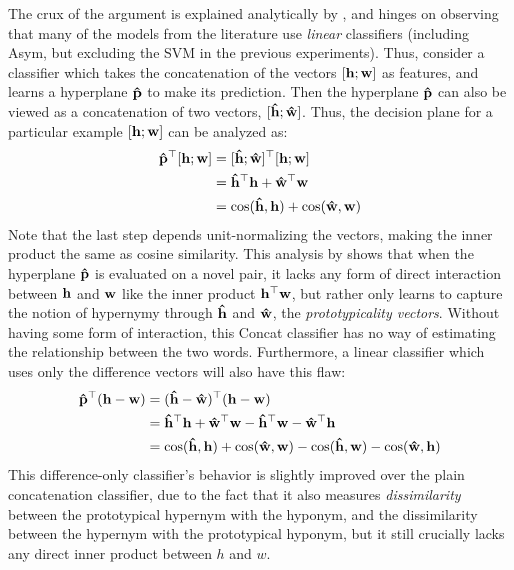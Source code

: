 The crux of the argument is explained analytically by
, and hinges on observing that many of the models from
the literature use {\em linear} classifiers (including Asym, but excluding the
SVM in the previous experiments). Thus, consider a classifier which takes the
concatenation of the vectors $[{\mathbf{h}}; {\mathbf{w}}]$ as features, and learns a hyperplane
${\mathbf{\hat p}}$ to make its prediction. Then the hyperplane ${\mathbf{\hat p}}$ can also be
viewed as a concatenation of two vectors, $[{\mathbf{\hat h}}; {\mathbf{\hat w}}]$. Thus, the decision
plane for a particular example $[{\mathbf{h}}; {\mathbf{w}}]$ can be analyzed as:
\begin{align}
  \begin{split}
  {\mathbf{\hat p}}^\top [{\mathbf{h}}; {\mathbf{w}}] & = [{\mathbf{\hat h}}; {\mathbf{\hat w}}]^\top [{\mathbf{h}}; {\mathbf{w}}]\\
  & = {\mathbf{\hat h}}^\top{\mathbf{h}} + {\mathbf{\hat w}}^\top{\mathbf{w}}\\
  & = \mbox{cos}({\mathbf{\hat h}}, {\mathbf{h}}) + \mbox{cos}({\mathbf{\hat w}}, {\mathbf{w}})
  \end{split}
  \label{eqn:prototypicality}
\end{align}
Note that the last step depends unit-normalizing the vectors, making the inner
product the same as cosine similarity.  This
analysis by  shows that when the hyperplane ${\mathbf{\hat p}}$
is evaluated on a novel pair, it lacks any form of direct interaction between
${\mathbf{h}}$ and ${\mathbf{w}}$ like the inner product ${\mathbf{h}}^{\top}{\mathbf{w}}$, but rather only learns to
capture the notion of hypernymy through ${\mathbf{\hat h}}$ and ${\mathbf{\hat w}}$, the {\em
prototypicality vectors}.  Without having some form of interaction, this Concat
classifier has no way of estimating the relationship between the two words.
Furthermore, a linear classifier which uses only the difference vectors will
also have this flaw:
\begin{align*}
  {\mathbf{\hat p}}^{\top} ({\mathbf{h}} - {\mathbf{w}}) & = ({\mathbf{\hat h}} - {\mathbf{\hat w}})^{\top} ({\mathbf{h}} - {\mathbf{w}})\\
  & = {\mathbf{\hat h}}^{\top} {\mathbf{h}} + {\mathbf{\hat w}}^{\top} {\mathbf{w}} - {\mathbf{\hat h}}^{\top} {\mathbf{w}} - {\mathbf{\hat w}}^{\top} {\mathbf{h}}\\
  & = \mbox{cos}({\mathbf{\hat h}}, {\mathbf{h}}) + \mbox{cos}({\mathbf{\hat w}}, {\mathbf{w}}) - \mbox{cos}({\mathbf{\hat h}}, {\mathbf{w}}) - \mbox{cos}({\mathbf{\hat w}}, {\mathbf{h}})
\end{align*}
This difference-only classifier's behavior is slightly improved over the plain
concatenation classifier, due to the fact that it also measures {\em
dissimilarity} between the prototypical hypernym with the hyponym, and the
dissimilarity between the hypernym with the prototypical hyponym, but it still
crucially lacks any direct inner product between $h$ and $w$.

